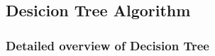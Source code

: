 \documentclass{beamer}
\begin{document}
\subsection{Desicion Tree Algorithm}
\begin{frame}
	\frametitle{Detailed overview of Decision Tree}
    \begin{figure}
        
    \end{figure}
    \end{frame}
\end{document}
